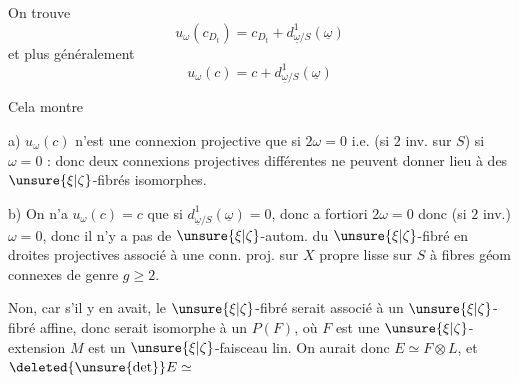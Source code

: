 On trouve
\[
u_\omega(c_{D_t})=c_{D_t}+d^1_{\underline{\omega}/S}(\underline{\omega})
\]
et plus généralement
\[
\boxed{u_\omega(c)=c+d^1_{\underline{\omega}/S}(\underline{\omega})}
\]

Cela montre

a) $u_\omega(c)$ n'est une connexion projective que si $2\omega=0$ i.e. (si $2$ inv. sur $S$) si $\omega=0$ : donc   deux connexions projectives différentes ne peuvent donner lieu à des $\unsure{\xi|\zeta}$-fibrés isomorphes.

b) On n'a $u_\omega(c)=c$ que si $d^1_{\underline{\omega}/S}(\underline{\omega})=0$, donc a fortiori $2\omega=0$ donc (si $2$ inv.) $\omega=0$, donc il n'y a pas de $\unsure{\xi|\zeta}$-autom. du \deleted{$\unsure{\xi}$} $\unsure{\xi|\zeta}$-fibré en droites projectives associé à une conn. proj. sur $X$ propre lisse sur $S$ à fibres géom connexes de genre $g\geq2$.



Non, car s'il y en avait, le $\unsure{\xi|\zeta}$-fibré serait associé à un $\unsure{\xi|\zeta}$-fibré affine, donc serait isomorphe à un $P(F)$, où $F$ est une $\unsure{\xi|\zeta}$-extension
$M$ est un $\unsure{\xi|\zeta}$-faisceau lin. On aurait donc $E\simeq F\otimes L$, et $\deleted{\unsure{\det}}E\simeq$
